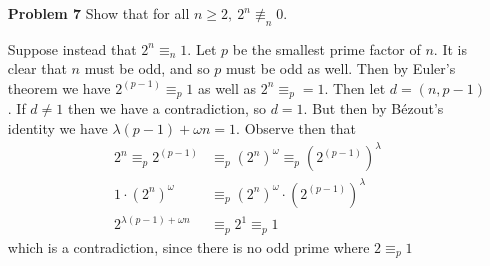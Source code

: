 \documentclass[letterpaper]{article}
\begin{document}
\begin{itemize}
    \item[\textbf{Problem 7}] Show that for all \(n \geq 2,\ 2^n \not\equiv_n  0\).

          Suppose instead that \(2^n \equiv_n 1\). Let \(p\) be the smallest prime factor of \(n\). It is clear that \(n\) must be odd, and so \(p\) must be odd as well. Then by Euler's theorem we have \(2^{(p-1)} \equiv_p 1\) as well as \(2^n \equiv_p = 1\). Then let \(d = (n, p-1)\). If \(d \neq 1\) then we have a contradiction, so \(d = 1\). But then by Bézout's identity we have \(\lambda(p-1) + \omega n = 1\). Observe then that
          \begin{align*}
              2^n \equiv_p 2^{(p-1)}      & \equiv_p {(2^n)}^\omega \equiv_p {(2^{(p-1)})}^\lambda \\
              1\cdot  {(2^n)}^\omega      & \equiv_p {(2^n)}^\omega \cdot {(2^{(p-1)})}^\lambda    \\
              2^{\lambda(p-1) + \omega n} & \equiv_p 2^1 \equiv_p 1
          \end{align*}
          which is a contradiction, since there is no odd prime where \(2 \equiv_p 1\)
\end{itemize}
\end{document}
